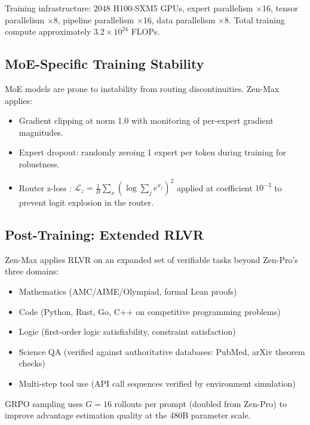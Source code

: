 \documentclass[11pt,a4paper]{article}
\begin{document}
Training infrastructure: 2048 H100-SXM5 GPUs, expert parallelism $\times$16, tensor
parallelism $\times$8, pipeline parallelism $\times$16, data parallelism $\times$8. Total
training compute approximately $3.2 \times 10^{24}$ FLOPs.

\subsection{MoE-Specific Training Stability}

MoE models are prone to instability from routing discontinuities. Zen-Max applies:

\begin{itemize}
  \item Gradient clipping at norm 1.0 with monitoring of per-expert gradient magnitudes.
  \item Expert dropout: randomly zeroing 1 expert per token during training for robustness.
  \item Router z-loss \cite{zoph2022stmoe}: $\mathcal{L}_z = \frac{1}{B}\sum_{x} (\log \sum_j e^{x_j})^2$
        applied at coefficient $10^{-3}$ to prevent logit explosion in the router.
\end{itemize}

\subsection{Post-Training: Extended RLVR}

Zen-Max applies RLVR on an expanded set of verifiable tasks beyond Zen-Pro's three domains:

\begin{itemize}
  \item Mathematics (AMC/AIME/Olympiad, formal Lean proofs)
  \item Code (Python, Rust, Go, C++ on competitive programming problems)
  \item Logic (first-order logic satisfiability, constraint satisfaction)
  \item Science QA (verified against authoritative databases: PubMed, arXiv theorem checks)
  \item Multi-step tool use (API call sequences verified by environment simulation)
\end{itemize}

GRPO sampling uses $G=16$ rollouts per prompt (doubled from Zen-Pro) to improve advantage
estimation quality at the 480B parameter scale.

\end{document}
